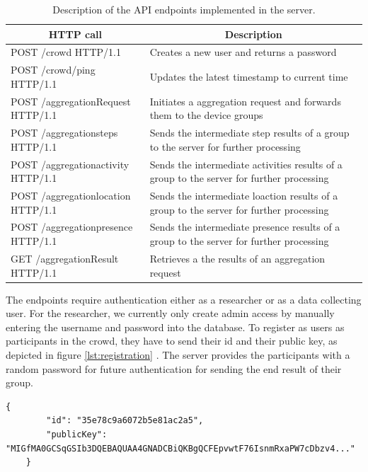 \begin{table}[htbp]
\centering
  \begin{tabularx}{0.92\textwidth}{|l|X|}                                                                             \hline
		\multicolumn{1}{|c|}{\textbf{HTTP call}} & \multicolumn{1}{c|}{\textbf{Description}} \\ [0.5ex] 
		\hline
		POST /crowd HTTP/1.1 & Creates a new user and returns a password \\
		\hline
		POST /crowd/ping HTTP/1.1 & Updates the latest timestamp to current time \\
		\hline
		POST /aggregationRequest HTTP/1.1 & Initiates a aggregation request and forwards them to the device groups \\ 
		\hline
		POST /aggregationsteps HTTP/1.1 & Sends the intermediate step results of a group to the server for further processing  \\ 
		\hline
		POST /aggregationactivity HTTP/1.1 & Sends the intermediate activities results of a group to the server for further processing  \\ 
		\hline
		POST /aggregationlocation HTTP/1.1 & Sends the intermediate loaction results of a group to the server for further processing  \\ 
		\hline
		POST /aggregationpresence HTTP/1.1 & Sends the intermediate presence results of a group to the server for further processing  \\ 
		\hline
		GET /aggregationResult HTTP/1.1 & Retrieves a the results of an aggregation request \\ 
		\hline
  \end{tabularx}
  \caption{Description of the API endpoints implemented in the server.}
  \label{tab:rest}
\end{table}

The endpoints require authentication either as a researcher or as a data collecting user. For the researcher, we currently only create admin access by manually entering the username and password into the database. To register as users as participants in the crowd, they have to send their id and their public key, as depicted in figure \ref{lst:registration} . The server provides the participants with a random password for future authentication for sending the end result of their group.

\begin{lstlisting}[caption=Registration message sent to the server, label={lst:registration}]
	{
	    "id": "35e78c9a6072b5e81ac2a5",
	    "publicKey": "MIGfMA0GCSqGSIb3DQEBAQUAA4GNADCBiQKBgQCFEpvwtF76IsnmRxaPW7cDbzv4..."
	}
\end{lstlisting}

